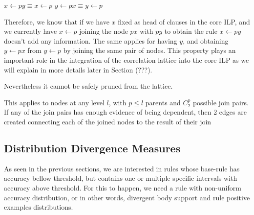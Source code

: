 \begin{center}
  $x \leftarrow py \equiv x \leftarrow p $ \newline 
  $y \leftarrow px \equiv y \leftarrow p $
\end{center}

Therefore, we know that if we have $x$ fixed as head of clauses in the core ILP, and we currently have $x \leftarrow p$
joining the node $px$ with $py$ to obtain the rule $x \leftarrow py$ doesn't add any information. The same applies
for having $y$, and obtaining $y \leftarrow px$ from $y \leftarrow p$ by joining the same pair of nodes. This property
plays an important role in the integration of the correlation lattice into the core ILP as we will explain in more
details later in Section (???).

Nevertheless it cannot be safely pruned from the lattice.  

\begin{comment}
In level 1 from \graphname, nodes can be directly pruned, on the other hand, for further levels, for a node to be
pruned by independence, all the possible joins resulting the node must be independent. In level 2, for example, in order
to prune the node $r a_1 b_1 c_1$, given that in level 1 the nodes $r a_1 b_1$, $r a_1 c_1$ and $r b_1 c_1$ were not
pruned. All the three possible join combinations should fail the independence test, i.e.:

\begin{equation}
\begin{split} 
  freq(r a_1 b_1 c_1) &\approx freq(r a_1)p (r b_1|r a_1) p(r c_1|r a_1) \\ 
  &\approx  freq(r b_1) p(r a_1|r b_1) p(r c_1|r b_1) \\ 
  &\approx  freq(r c_1) p(r a_1|r c_1) p(r b_1|r c_1)  
\end{split}
\end{equation}
\end{comment}

This applies to nodes at any level $l$, with $p \leq l$ parents and $C_{2}^{p}$ possible join pairs. If any of the join
pairs has enough evidence of being dependent, then 2 edges are created connecting each of the joined
nodes to the result of their join

\subsection{Distribution Divergence Measures}

As seen in the previous sections, we are interested in rules whose base-rule has accuracy bellow threshold, but contains
one or multiple specific intervals with accuracy above threshold. For this to happen, we need a rule with non-uniform
accuracy distribution, or in other words, divergent body support and rule positive examples distributions.

